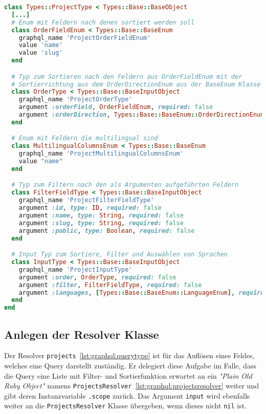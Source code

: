 \begin{lstlisting}[language=Ruby,float=h!,caption={Definition der Input Typen in \lstinline|/graphql/types/project_type.rb|}, label={lst:graphql:inputtype}]
class Types::ProjectType < Types::Base::BaseObject
  [...]
  # Enum mit Feldern nach denen sortiert werden soll 
  class OrderFieldEnum < Types::Base::BaseEnum
    graphql_name 'ProjectOrderFieldEnum'
    value 'name'
    value 'slug'
  end

  # Typ zum Sortieren nach den Feldern aus OrderFieldEnum mit der
  # Sortierrichtung aus dem OrderDirectionEnum aus der BaseEnum Klasse
  class OrderType < Types::Base::BaseInputObject
    graphql_name 'ProjectOrderType'
    argument :orderField, OrderFieldEnum, required: false
    argument :orderDirection, Types::Base::BaseEnum::OrderDirectionEnum, required: false
  end

  # Enum mit Feldern die multilingual sind
  class MultilingualColumnsEnum < Types::Base::BaseEnum
    graphql_name 'ProjectMultilingualColumnsEnum'
    value "name"
  end

  # Typ zum Filtern nach den als Argumenten aufgeführten Feldern
  class FilterFieldType < Types::Base::BaseInputObject
    graphql_name 'ProjectFilterFieldType'
    argument :id, type: ID, required: false
    argument :name, type: String, required: false
    argument :slug, type: String, required: false
    argument :public, type: Boolean, required: false
  end

  # Input Typ zum Sortiere, Filter und Auswählen von Sprachen
  class InputType < Types::Base::BaseInputObject
    graphql_name 'ProjectInputType'
    argument :order, OrderType, required: false
    argument :filter, FilterFieldType, required: false
    argument :languages, [Types::Base::BaseEnum::LanguageEnum], required: false
  end
end
\end{lstlisting}

\subsection{Anlegen der Resolver Klasse}
\label{graphql:resolver}
Der Resolver \lstinline|projects|~\ref{lst:graphql:querytype} ist für das Auflösen eines Feldes, welches eine Query darstellt zuständig. Er delegiert diese Aufgabe im Falle, dass die Query eine Liste mit Filter- und Sortierfunktion erwartet an ein \emph{"Plain Old Ruby Object"} namens \lstinline|ProjectsResolver|~\ref{lst:graphql:projectsresolver} weiter und gibt deren Instanzvariable \lstinline|.scope| zurück. Das Argument \lstinline|input| wird ebenfalls weiter an die \lstinline|ProjectsResolver| Klasse übergeben, wenn dieses nicht \lstinline|nil| ist. 

